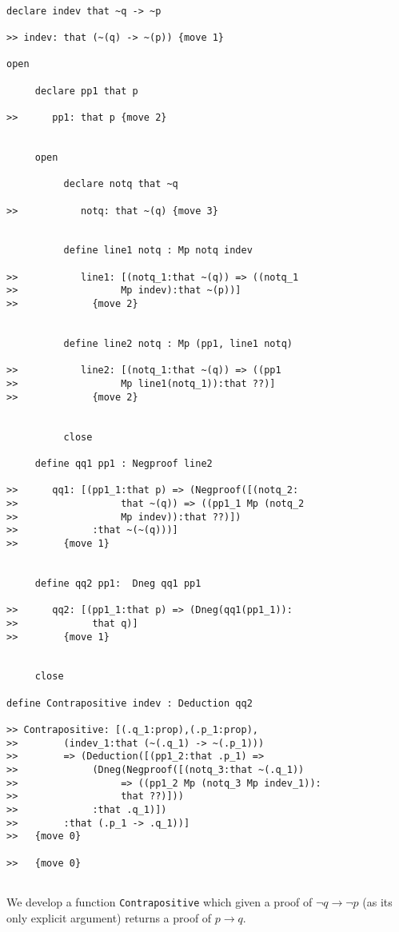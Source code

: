\documentclass[12pt]{article}
\begin{document}
\begin{verbatim}

declare indev that ~q -> ~p

>> indev: that (~(q) -> ~(p)) {move 1}

open

     declare pp1 that p

>>      pp1: that p {move 2}


     open

          declare notq that ~q

>>           notq: that ~(q) {move 3}


          define line1 notq : Mp notq indev

>>           line1: [(notq_1:that ~(q)) => ((notq_1 
>>                  Mp indev):that ~(p))]
>>             {move 2}


          define line2 notq : Mp (pp1, line1 notq)

>>           line2: [(notq_1:that ~(q)) => ((pp1 
>>                  Mp line1(notq_1)):that ??)]
>>             {move 2}


          close

     define qq1 pp1 : Negproof line2

>>      qq1: [(pp1_1:that p) => (Negproof([(notq_2:
>>                  that ~(q)) => ((pp1_1 Mp (notq_2 
>>                  Mp indev)):that ??)])
>>             :that ~(~(q)))]
>>        {move 1}


     define qq2 pp1:  Dneg qq1 pp1

>>      qq2: [(pp1_1:that p) => (Dneg(qq1(pp1_1)):
>>             that q)]
>>        {move 1}


     close

define Contrapositive indev : Deduction qq2

>> Contrapositive: [(.q_1:prop),(.p_1:prop),
>>        (indev_1:that (~(.q_1) -> ~(.p_1))) 
>>        => (Deduction([(pp1_2:that .p_1) => 
>>             (Dneg(Negproof([(notq_3:that ~(.q_1)) 
>>                  => ((pp1_2 Mp (notq_3 Mp indev_1)):
>>                  that ??)]))
>>             :that .q_1)])
>>        :that (.p_1 -> .q_1))]
>>   {move 0}

>>   {move 0}


\end{verbatim}

We develop a function {\tt Contrapositive} which given a proof of $\neg q \rightarrow \neg p$ (as its only explicit argument) returns
a proof of $p \rightarrow q$.
\end{document}
